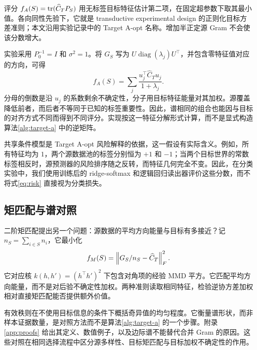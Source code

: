 评分 $f_A(S)=\operatorname{tr}(\widehat C_TP_S)$ 用无标签目标特征估计第二项，在固定超参数下取其最小值。各向同性先验下，它就是 transductive experimental design 的正则化目标方差准则\citep{yu2006,hubotter2024transductive}；本文沿用实验记录中的 Target A-opt 名称。增加半正定源 Gram 不会使该分数增大。

实验采用 $P_0^{-1}=I$ 和 $\sigma^2=1$。将 $G_S$ 写为 $U\operatorname{diag}(\lambda_j)U^\top$，并包含零特征值对应的方向，可得
\begin{equation}
 f_A(S)=\sum_j\frac{u_j^\top\widehat C_Tu_j}{1+\lambda_j}.
 \label{eq:target-directions}
\end{equation}
分母的倒数是沿 $u_j$ 的系数剩余不确定性，分子用目标特征能量对其加权。源覆盖降低前者，而后者不等同于已知的标签重要性。因此，谱相同的组合也能因与目标的对齐方式不同而得到不同评分。实现按这一特征分解形式计算，而不是显式构造算法\ref{alg:target-a} 中的逆矩阵。

共享条件模型是 Target A-opt 风险解释的依据，这一假设有实际含义。例如，所有特征均为 $1$，两个源数据池的标签分别恒为 $+1$ 和 $-1$；当两个目标世界的常数标签相反时，源预测器的风险排序随之反转，而特征几何完全不变。因此，在分类实验中，我们使用训练后的 ridge-softmax 和逻辑回归读出器评价这些分数，而不将式\eqref{eq:risk} 直接视为分类损失。

\subsection{矩匹配与谱对照}
二阶矩匹配提出另一个问题：源数据的平均方向能量与目标有多接近？记 $n_S=\sum_{i\in S}n_i$，它最小化
\begin{equation}
 f_M(S)=\left\lVert G_S/n_S-\widehat C_T\right\rVert_F^2.
 \label{eq:mmd}
\end{equation}
它对应核 $k(h,h')=(h^\top h')^2$ 下包含对角项的经验 MMD 平方。它匹配平均方向能量，而不是对后验不确定性加权。两种准则读取相同特征，检验逆协方差加权相对直接矩匹配能否提供额外价值。

有效秩则在不使用目标信息的条件下概括奇异值的均匀程度\citep{roy2007}。它衡量谱形状，而非样本证据数量，是对照方法而不是算法\ref{alg:target-a} 的一个步骤。附录\ref{app:proofs} 给出其定义、数值例子，以及边际谱不能替代合并 Gram 的原因。这些对照在相同选择流程中区分源多样性、目标矩匹配与目标加权不确定性的作用。

